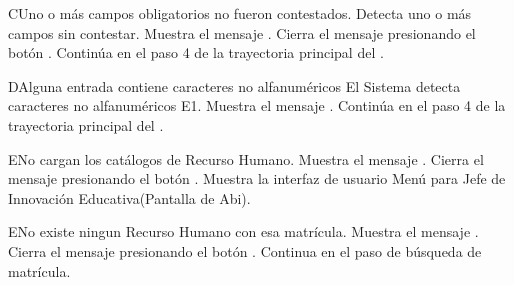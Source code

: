 
\begin{UCtrayectoriaA}{C}{Uno o más campos obligatorios no fueron contestados.}
	\UCpaso Detecta uno o más campos sin contestar.
    \UCpaso Muestra el mensaje .
    \UCpaso[\UCactor] Cierra el mensaje presionando el botón .
    \UCpaso Continúa en el paso 4 de la trayectoria principal del .
\end{UCtrayectoriaA}

\begin{UCtrayectoriaA}{D}{Alguna entrada  contiene caracteres no alfanuméricos}
	\UCpaso El Sistema detecta caracteres no alfanuméricos E1.
    \UCpaso Muestra el mensaje .
    \UCpaso Continúa en el paso 4 de la trayectoria principal del .
\end{UCtrayectoriaA}

\begin{UCtrayectoriaA}{E}{No cargan los catálogos de Recurso Humano.}
    \UCpaso Muestra el mensaje .
    \UCpaso[\UCactor] Cierra el mensaje presionando el botón .
\UCpaso Muestra la interfaz de usuario Menú para Jefe de Innovación Educativa(Pantalla de Abi).
\end{UCtrayectoriaA}

\begin{UCtrayectoriaA}{E}{No existe ningun Recurso Humano con esa matrícula.}
    \UCpaso Muestra el mensaje .
    \UCpaso[\UCactor] Cierra el mensaje presionando el botón .
\UCpaso Continua en el paso  de búsqueda de matrícula.
\end{UCtrayectoriaA}